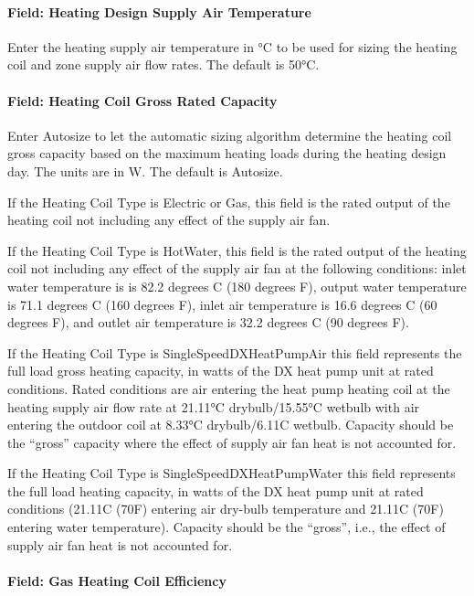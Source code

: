 \paragraph{Field: Heating Design Supply Air Temperature}\label{field-heating-design-supply-air-temperature-2}

Enter the heating supply air temperature in °C to be used for sizing the heating coil and zone supply air flow rates. The default is 50°C.

\paragraph{Field: Heating Coil Gross Rated Capacity}\label{field-heating-coil-gross-rated-capacity}

Enter Autosize to let the automatic sizing algorithm determine the heating coil gross capacity based on the maximum heating loads during the heating design day. The units are in W. The default is Autosize.

If the Heating Coil Type is Electric or Gas, this field is the rated output of the heating coil not including any effect of the supply air fan.

If the Heating Coil Type is HotWater, this field is the rated output of the heating coil not including any effect of the supply air fan at the following conditions: inlet water temperature is is 82.2 degrees C (180 degrees F), output water temperature is 71.1 degrees C (160 degrees F), inlet air temperature is 16.6 degrees C (60 degrees F), and outlet air temperature is 32.2 degrees C (90 degrees F).

If the Heating Coil Type is SingleSpeedDXHeatPumpAir this field represents the full load gross heating capacity, in watts of the DX heat pump unit at rated conditions. Rated conditions are air entering the heat pump heating coil at the heating supply air flow rate at 21.11°C drybulb/15.55°C wetbulb with air entering the outdoor coil at 8.33°C drybulb/6.11C wetbulb. Capacity should be the ``gross'' capacity where the effect of supply air fan heat is not accounted for.

If the Heating Coil Type is SingleSpeedDXHeatPumpWater this field represents the full load heating capacity, in watts of the DX heat pump unit at rated conditions (21.11C (70F) entering air dry-bulb temperature and 21.11C (70F) entering water temperature). Capacity should be the ``gross'', i.e., the effect of supply air fan heat is not accounted for.

\paragraph{Field: Gas Heating Coil Efficiency}\label{field-gas-heating-coil-efficiency-2}

